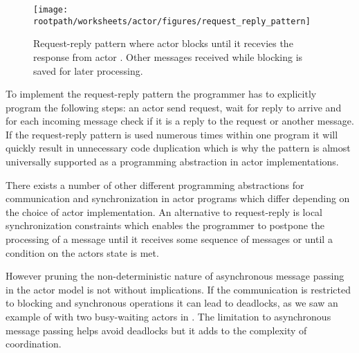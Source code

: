 \begin{figure}[h!]
\centering
\texttt{[image: \\rootpath/worksheets/actor/figures/request\_reply\_pattern]}
\caption{Request-reply pattern where actor  blocks until it recevies the response from actor . Other messages received while blocking is saved for later processing.}\label{fig:request_reply_pattern}
\end{figure}

To implement the request-reply pattern the programmer has to explicitly program the following steps: an actor send request, wait for reply to arrive and for each incoming message check if it is a reply to the request or another message. If the request-reply pattern is used numerous times within one program it will quickly result in unnecessary code duplication which is why the pattern is almost universally supported as a programming abstraction in actor implementations\cite[p. 5]{karmani2009actor}.

There exists a number of other different programming abstractions for communication and synchronization in actor programs which differ depending on the choice of actor implementation\cite[p. 6]{karmani2009actor}. An alternative to request-reply is local synchronization constraints which enables the programmer to postpone the processing of a message until it receives some sequence of messages or until a condition on the actors state is met.

However pruning the non-deterministic nature of asynchronous message passing in the actor model is not without implications. If the communication is restricted to blocking and synchronous operations it can lead to deadlocks, as we saw an example of with two busy-waiting actors in . The limitation to asynchronous message passing helps avoid deadlocks but it adds to the complexity of coordination\cite[p. 311]{tasharofi2013scala}.


